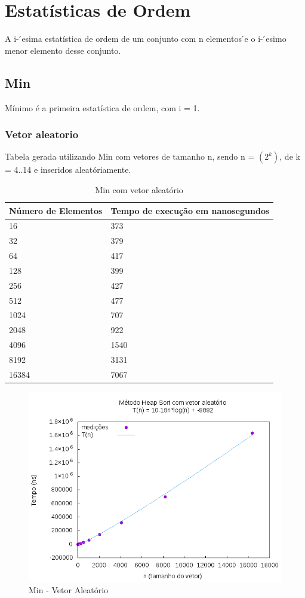 \documentclass[12pt,a4paper,twoside]{report}
\begin{document}
\chapter{Estatísticas de Ordem}

A i- ́esima estatística de ordem de um conjunto com n elementos ́e o i- ́esimo menor elemento desse conjunto.

\section{Min}

Mínimo é a primeira estatística de ordem, com i = 1.

\subsection{Vetor aleatorio}
Tabela gerada utilizando Min com vetores de tamanho n, sendo n = $(2^k)$, de k = 4..14 e inseridos aleatóriamente.
\begin{table}[H]
\centering
\caption{Min com vetor aleatório}
\label{my-label}
\begin{tabular}{|l|l|}
\hline
\multicolumn{1}{|c|}{\textbf{Número de Elementos}} & \multicolumn{1}{c|}{\textbf{Tempo de execução em nanosegundos}} \\ \hline
16 & 373 \\ \hline
32 & 379 \\ \hline
64 & 417 \\ \hline
128 & 399 \\ \hline
256 & 427 \\ \hline
512 & 477 \\ \hline
1024 & 707 \\ \hline
2048 & 922 \\ \hline
4096 & 1540 \\ \hline
8192 & 3131 \\ \hline
16384 & 7067 \\ \hline
\end{tabular}
\end{table}

\begin{figure}[H]
    \centering
    \includegraphics[width=0.7\linewidth]{graficos/HeapSort/vIntAleatorio/vIntAleatorio.png}
  \caption{Min - Vetor Aleatório}
\end{figure}
\end{document}
